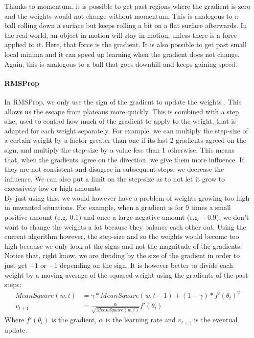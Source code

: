 Thanks to momentum, it is possible to get past regions where the gradient is zero and the weights would not change without momentum.
This is analogous to a ball rolling down a surface but keeps rolling a bit on a flat surface afterwards. In the real world, an object in motion will stay in motion, unless there is a force applied to it.
Here, that force is the gradient. It is also possible to get past small local minima and it can speed up learning when the gradient does not change. Again, this is analogous to a ball that goes downhill and keeps gaining speed.\\

\paragraph{RMSProp} %
\label{par:rmsprop}
In RMSProp, we only use the sign of the gradient to update the weights \citep{Tieleman2012LectureMagnitude.}. This allows us the escape from plateaus more quickly. This is combined with a step size, used to control how much of the gradient to apply to the weight, that is adapted for each weight separately.
For example, we can multiply the step-size of a certain weight by a factor greater than one if its last 2 gradients agreed on the sign, and multiply the step-size by a value less than 1 otherwise.
This means that, when the gradients agree on the direction, we give them more influence. If they are not consistent and disagree in subsequent steps, we decrease the influence. We can also put a limit on the step-size as to not let it grow to excessively low or high amounts.\\
By just using this, we would however have a problem of weights growing too high in unwanted situations. For example, when a gradient is for 9 times a small positive amount (e.g. $0.1$) and once a large negative amount (e.g. $-0.9$), we don't want to change the weights a lot because they balance each other out.
Using the current algorithm however, the step-size and so the weights would become too high because we only look at the signs and not the magnitude of the gradients.\\
Notice that, right know, we are dividing by the size of the gradient in order to just get $+1$ or $-1$ depending on the sign. It is however better to divide each weight by a moving average of the squared weight using the gradients of the past steps:
\begin{align}
MeanSquare(w, t) &= \gamma * MeanSquare(w, t-1) + (1 - \gamma) * f'(\theta_t)^2 \\
v_{t+1} &= \frac{\alpha}{\sqrt{MeanSquare(w,t)}}f'(\theta_t)
\end{align}
Where $f'(\theta_t)$ is the gradient, $\alpha$ is the learning rate and $v_{t+1}$ is the eventual update.


